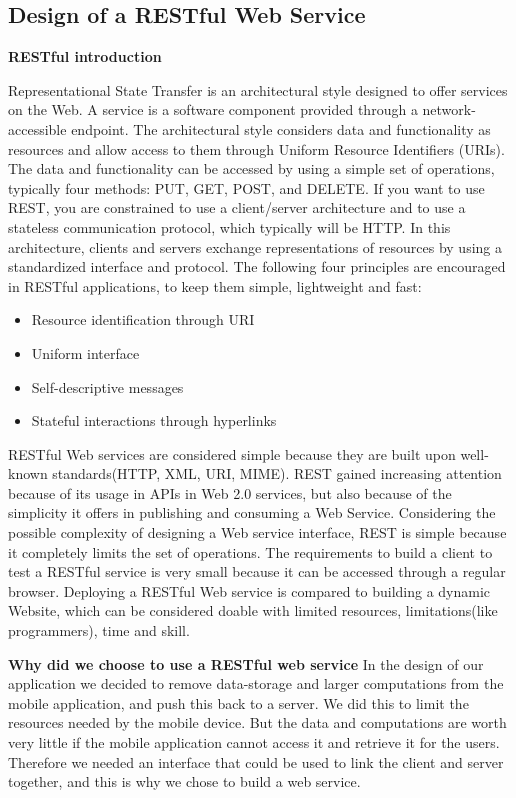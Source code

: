 \subsection{Design of a RESTful Web Service}
\label{subsec:restDes}

\textbf{RESTful introduction}\newline

Representational State Transfer is an architectural style designed to offer services on the Web. A service is a software component provided through a network-accessible endpoint. The architectural style considers data and functionality as resources and allow access to them through Uniform Resource Identifiers (URIs). The data and functionality can be accessed by using a simple set of operations, typically four methods: PUT, GET, POST, and DELETE. If you want to use REST, you are constrained to use a client/server architecture and to use a stateless communication protocol, which typically will be HTTP. In this architecture, clients and servers exchange representations of resources by using a standardized interface and protocol. The following four principles are encouraged in RESTful applications, to keep them simple, lightweight and fast\cite{WhatAreRESTful}\cite{choosingRESTful}:
\begin{itemize}
\item Resource identification through URI
\item Uniform interface
\item Self-descriptive messages
\item Stateful interactions through hyperlinks
\end{itemize}

RESTful Web services are considered simple because they are built upon well-known standards(HTTP, XML, URI, MIME). REST gained increasing attention because of its usage in APIs in Web 2.0 services, but also because of the simplicity it offers in publishing and consuming a Web Service. Considering the possible complexity of designing a Web service interface, REST is simple because it completely limits the set of operations. The requirements to build a client to test a RESTful service is very small because it can be accessed through a regular browser. Deploying a RESTful Web service is compared to building a dynamic Website, which can be considered doable with limited resources, limitations(like programmers), time and skill. 

\textbf{Why did we choose to use a RESTful web service}
In the design of our application we decided to remove data-storage and larger computations from the mobile application, and push this back to a server. We did this to limit the resources needed by the mobile device. But the data and computations are worth very little if the mobile application cannot access it and retrieve it for the users. Therefore we needed an interface that could be used to link the client and server together, and this is why we chose to build a web service.

